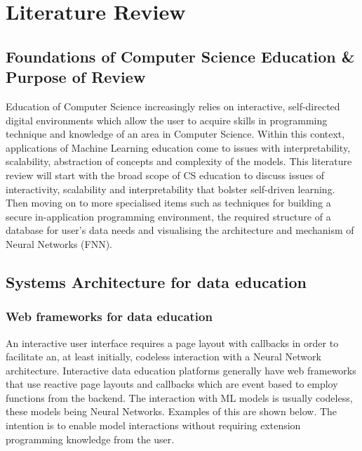 \documentclass{article}
\begin{document}
\section{Literature Review} 
\subsection{Foundations of Computer Science Education \& Purpose of Review}
Education of Computer Science increasingly relies on interactive, self-directed digital environments which allow the user to acquire skills in programming technique and knowledge of an area in Computer Science. Within this context, applications of Machine Learning education come to issues with interpretability, scalability, abstraction of concepts and complexity of the models. This literature review will start with the broad scope of CS education to discuss issues of interactivity, scalability and interpretability that bolster self-driven learning. Then moving on to more specialised items such as techniques for building a secure in-application programming environment, the required structure of a database for user's data needs and visualising the architecture and mechanism of Neural Networks (FNN).



\subsection{Systems Architecture for data education} %
\subsubsection{Web frameworks for data education}
An interactive user interface requires a page layout with callbacks in order to facilitate an, at least initially, codeless interaction with a Neural Network architecture.
Interactive data education platforms generally have web frameworks that use reactive page layouts and callbacks which are event based to employ functions from the backend. The interaction with ML models is usually codeless, these models being Neural Networks. Examples of this are shown below. The intention is to enable model interactions without requiring extension programming knowledge from the user.
\end{document}
